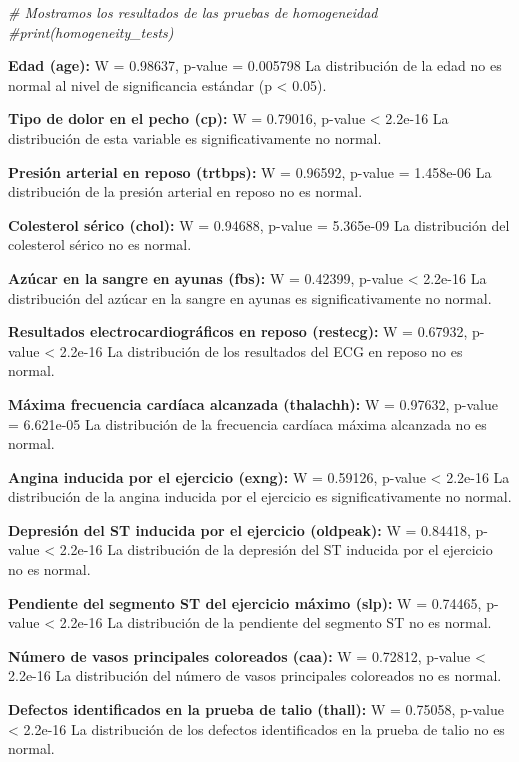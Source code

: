 \documentclass[
]{article}
\newenvironment{Shaded}{\begin{snugshade}}{\end{snugshade}}
\newcommand{\CommentTok}[1]{\textcolor[rgb]{0.56,0.35,0.01}{\textit{#1}}}
\begin{document}
\begin{Shaded}
\begin{Highlighting}[]
\CommentTok{\# Mostramos los resultados de las pruebas de homogeneidad}
\CommentTok{\#print(homogeneity\_tests)}
\end{Highlighting}
\end{Shaded}

\textbf{Edad (age):} W = 0.98637, p-value = 0.005798 La distribución de
la edad no es normal al nivel de significancia estándar (p \textless{}
0.05).

\textbf{Tipo de dolor en el pecho (cp):} W = 0.79016, p-value
\textless{} 2.2e-16 La distribución de esta variable es
significativamente no normal.

\textbf{Presión arterial en reposo (trtbps):} W = 0.96592, p-value =
1.458e-06 La distribución de la presión arterial en reposo no es normal.

\textbf{Colesterol sérico (chol):} W = 0.94688, p-value = 5.365e-09 La
distribución del colesterol sérico no es normal.

\textbf{Azúcar en la sangre en ayunas (fbs):} W = 0.42399, p-value
\textless{} 2.2e-16 La distribución del azúcar en la sangre en ayunas es
significativamente no normal.

\textbf{Resultados electrocardiográficos en reposo (restecg):} W =
0.67932, p-value \textless{} 2.2e-16 La distribución de los resultados
del ECG en reposo no es normal.

\textbf{Máxima frecuencia cardíaca alcanzada (thalachh):} W = 0.97632,
p-value = 6.621e-05 La distribución de la frecuencia cardíaca máxima
alcanzada no es normal.

\textbf{Angina inducida por el ejercicio (exng):} W = 0.59126, p-value
\textless{} 2.2e-16 La distribución de la angina inducida por el
ejercicio es significativamente no normal.

\textbf{Depresión del ST inducida por el ejercicio (oldpeak):} W =
0.84418, p-value \textless{} 2.2e-16 La distribución de la depresión del
ST inducida por el ejercicio no es normal.

\textbf{Pendiente del segmento ST del ejercicio máximo (slp):} W =
0.74465, p-value \textless{} 2.2e-16 La distribución de la pendiente del
segmento ST no es normal.

\textbf{Número de vasos principales coloreados (caa):} W = 0.72812,
p-value \textless{} 2.2e-16 La distribución del número de vasos
principales coloreados no es normal.

\textbf{Defectos identificados en la prueba de talio (thall):} W =
0.75058, p-value \textless{} 2.2e-16 La distribución de los defectos
identificados en la prueba de talio no es normal.
\end{document}
